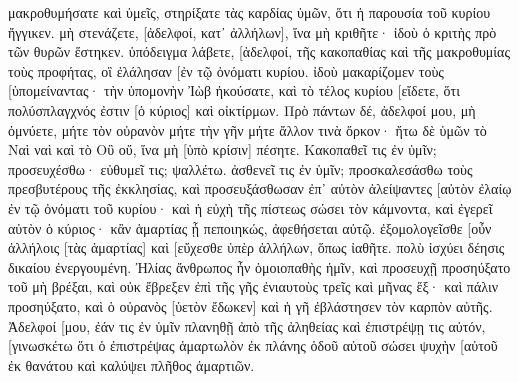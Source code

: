 μακροθυμήσατε καὶ ὑμεῖς, στηρίξατε τὰς καρδίας ὑμῶν, ὅτι ἡ παρουσία τοῦ κυρίου ἤγγικεν. 
μὴ στενάζετε, [ἀδελφοί, κατ᾽ ἀλλήλων], ἵνα μὴ κριθῆτε· ἰδοὺ ὁ κριτὴς πρὸ τῶν θυρῶν ἕστηκεν. 
ὑπόδειγμα λάβετε, [ἀδελφοί, τῆς κακοπαθίας καὶ τῆς μακροθυμίας τοὺς προφήτας, οἳ ἐλάλησαν [ἐν τῷ ὀνόματι κυρίου. 
ἰδοὺ μακαρίζομεν τοὺς [ὑπομείναντας· τὴν ὑπομονὴν Ἰὼβ ἠκούσατε, καὶ τὸ τέλος κυρίου [εἴδετε, ὅτι πολύσπλαγχνός ἐστιν [ὁ κύριος] καὶ οἰκτίρμων. 
Πρὸ πάντων δέ, ἀδελφοί μου, μὴ ὀμνύετε, μήτε τὸν οὐρανὸν μήτε τὴν γῆν μήτε ἄλλον τινὰ ὅρκον· ἤτω δὲ ὑμῶν τὸ Ναὶ ναὶ καὶ τὸ Οὒ οὔ, ἵνα μὴ [ὑπὸ κρίσιν] πέσητε. 
Κακοπαθεῖ τις ἐν ὑμῖν; προσευχέσθω· εὐθυμεῖ τις; ψαλλέτω. 
ἀσθενεῖ τις ἐν ὑμῖν; προσκαλεσάσθω τοὺς πρεσβυτέρους τῆς ἐκκλησίας, καὶ προσευξάσθωσαν ἐπ᾽ αὐτὸν ἀλείψαντες [αὐτὸν ἐλαίῳ ἐν τῷ ὀνόματι τοῦ κυρίου· 
καὶ ἡ εὐχὴ τῆς πίστεως σώσει τὸν κάμνοντα, καὶ ἐγερεῖ αὐτὸν ὁ κύριος· κἂν ἁμαρτίας ᾖ πεποιηκώς, ἀφεθήσεται αὐτῷ. 
ἐξομολογεῖσθε [οὖν ἀλλήλοις [τὰς ἁμαρτίας] καὶ [εὔχεσθε ὑπὲρ ἀλλήλων, ὅπως ἰαθῆτε. πολὺ ἰσχύει δέησις δικαίου ἐνεργουμένη. 
Ἠλίας ἄνθρωπος ἦν ὁμοιοπαθὴς ἡμῖν, καὶ προσευχῇ προσηύξατο τοῦ μὴ βρέξαι, καὶ οὐκ ἔβρεξεν ἐπὶ τῆς γῆς ἐνιαυτοὺς τρεῖς καὶ μῆνας ἕξ· 
καὶ πάλιν προσηύξατο, καὶ ὁ οὐρανὸς [ὑετὸν ἔδωκεν] καὶ ἡ γῆ ἐβλάστησεν τὸν καρπὸν αὐτῆς. 
Ἀδελφοί [μου, ἐάν τις ἐν ὑμῖν πλανηθῇ ἀπὸ τῆς ἀληθείας καὶ ἐπιστρέψῃ τις αὐτόν, 
[γινωσκέτω ὅτι ὁ ἐπιστρέψας ἁμαρτωλὸν ἐκ πλάνης ὁδοῦ αὐτοῦ σώσει ψυχὴν [αὐτοῦ ἐκ θανάτου καὶ καλύψει πλῆθος ἁμαρτιῶν. 

